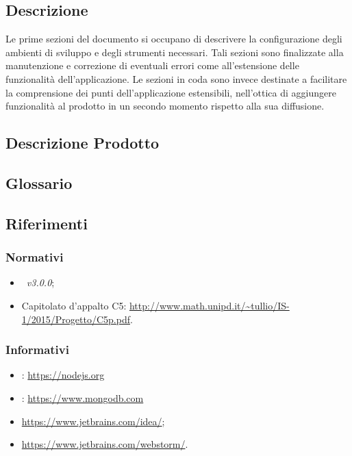 \documentclass[12pt,a4paper]{article}
\begin{document}
	\subsection{Descrizione}
	Le prime sezioni del documento si occupano di descrivere la configurazione degli ambienti di sviluppo e degli strumenti necessari. Tali sezioni sono finalizzate alla manutenzione e correzione di eventuali errori come all'estensione delle funzionalità dell'applicazione. Le sezioni in coda sono invece destinate a facilitare la comprensione dei punti dell'applicazione estensibili, nell'ottica di aggiungere funzionalità al prodotto in un secondo momento rispetto alla sua diffusione.
	
	\subsection{Descrizione Prodotto}
	\descrizioneProdotto
	
	\subsection{Glossario}
	\glossarioPrint
	
	\subsection{Riferimenti}
	\subsubsection{Normativi}
	\begin{itemize}
		\item \NdP\ \textit{v3.0.0};
		\item Capitolato d'appalto C5: \url{http://www.math.unipd.it/~tullio/IS-1/2015/Progetto/C5p.pdf}.
	\end{itemize}
	\subsubsection{Informativi}
	\begin{itemize}
		\item {}: \url{https://nodejs.org}  
		\item {}: \url{https://www.mongodb.com}
		\item {}   \url{https://www.jetbrains.com/idea/};
		\item {}  \url{https://www.jetbrains.com/webstorm/}.
	\end{itemize}
		
\end{document}
